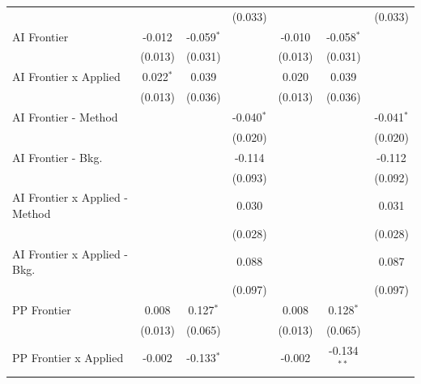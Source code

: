 \begin{tabular}{lcccccc}
                                  &                &               & (0.033)       &                &               & (0.033)\\   
   AI Frontier                    & -0.012         & -0.059$^{*}$  &               & -0.010         & -0.058$^{*}$  &   \\   
                                  & (0.013)        & (0.031)       &               & (0.013)        & (0.031)       &   \\   
   AI Frontier x Applied          & 0.022$^{*}$    & 0.039         &               & 0.020          & 0.039         &   \\   
                                  & (0.013)        & (0.036)       &               & (0.013)        & (0.036)       &   \\   
   AI Frontier - Method           &                &               & -0.040$^{*}$  &                &               & -0.041$^{*}$\\   
                                  &                &               & (0.020)       &                &               & (0.020)\\   
   AI Frontier - Bkg.             &                &               & -0.114        &                &               & -0.112\\   
                                  &                &               & (0.093)       &                &               & (0.092)\\   
   AI Frontier x Applied - Method &                &               & 0.030         &                &               & 0.031\\   
                                  &                &               & (0.028)       &                &               & (0.028)\\   
   AI Frontier x Applied - Bkg.   &                &               & 0.088         &                &               & 0.087\\   
                                  &                &               & (0.097)       &                &               & (0.097)\\   
   PP Frontier                    & 0.008          & 0.127$^{*}$   &               & 0.008          & 0.128$^{*}$   &   \\   
                                  & (0.013)        & (0.065)       &               & (0.013)        & (0.065)       &   \\   
   PP Frontier x Applied          & -0.002         & -0.133$^{*}$  &               & -0.002         & -0.134$^{**}$ &   \\   

\end{tabular}
